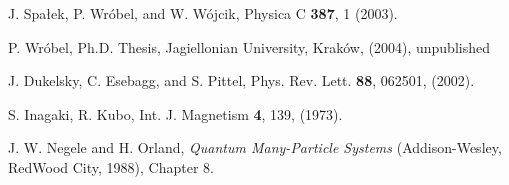 \documentclass[aps,prb,showpacs,reprint]{revtex4-1}
\begin{document}
\begin{thebibliography}{99}
J. Spa\l ek, P. Wr\'obel, and W. W\'ojcik, Physica C {\bf 387}, 1 (2003).

P. Wr\'obel, Ph.D. Thesis, Jagiellonian University, Krak\'ow, (2004), unpublished

J. Dukelsky, C. Esebagg, and S. Pittel, Phys. Rev. Lett. {\bf 88}, 062501, (2002).

S. Inagaki, R. Kubo, Int. J. Magnetism {\bf 4}, 139, (1973).

J. W. Negele and H. Orland, \textit{Quantum Many-Particle Systems}
(Addison-Wesley, RedWood City, 1988), Chapter 8.

\end{thebibliography}
\end{document}
